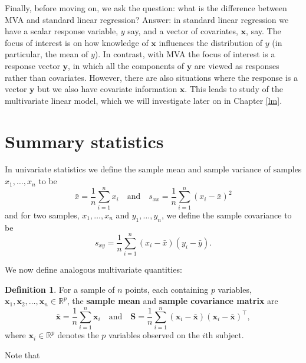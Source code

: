 \documentclass[]{book}
\theoremstyle{definition}
\newtheorem{definition}{Definition}[chapter]
\theoremstyle{definition}
\theoremstyle{definition}
\theoremstyle{remark}
\begin{document}
Finally, before moving on, we ask the question: what is the difference between MVA and standard linear regression? Answer: in standard linear regression we have a scalar response variable, \(y\) say, and a vector of covariates, \(\boldsymbol x\), say. The focus of interest is on how knowledge of \(\boldsymbol x\) influences the distribution of \(y\) (in particular, the mean of \(y\)). In contrast, with MVA the focus of interest is a response vector \(\boldsymbol y\), in which all the components of \(\boldsymbol y\) are viewed as responses rather than covariates. However, there are also situations where the response is a vector \(\boldsymbol y\) but we also have covariate information \(\boldsymbol x\). This leads to study of the multivariate linear model, which we will investigate later on in Chapter \ref{lm}.

\hypertarget{summary-statistics}{%
\section{Summary statistics}\label{summary-statistics}}

In univariate statistics we define the sample mean and sample variance of samples \(x_1, \ldots, x_n\) to be
\[ \bar{x} = \frac{1}{n} \sum_{i=1}^n x_i \quad \text{and} \quad s_{xx} = \frac{1}{n} \sum_{i=1}^n (x_i - \bar{x})^2 \]
and for two samples, \(x_1, \ldots, x_n\) and \(y_1, \ldots, y_n\), we define the sample covariance to be
\[s_{xy}=\frac{1}{n}\sum_{i=1}^n (x_i-\bar{x})(y_i-\bar{y}).\]

We now define analogous multivariate quantities:

\begin{definition}
\protect\hypertarget{def:samplemean}{}{\label{def:samplemean} }For a sample of \(n\) points, each containing \(p\) variables, \(\boldsymbol x_1, \boldsymbol x_2, \ldots, \boldsymbol x_n \in \mathbb{R}^p\), the \textbf{sample mean} and \textbf{sample covariance matrix} are
\[ \bar{\boldsymbol x} = \frac{1}{n} \sum_{i=1}^n \boldsymbol x_i \quad \text{and} \quad \boldsymbol S= \frac{1}{n} \sum_{i=1}^n (\boldsymbol x_i - \bar{\boldsymbol x}) (\boldsymbol x_i - \bar{\boldsymbol x})^\top, \]
where \(\boldsymbol x_i\in \mathbb{R}^p\) denotes the \(p\) variables observed on the \(i\)th subject.
\end{definition}

Note that
\end{document}
